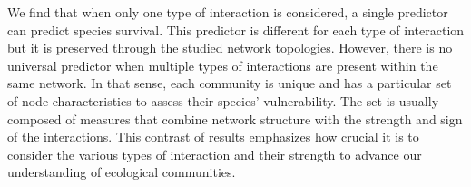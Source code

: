 We find that when only one type of interaction is considered, a single predictor can predict species survival. 
This predictor is different for each type of interaction but it is preserved through the studied network topologies. However, there is no universal predictor when multiple types of interactions are present within the same network. In that sense, each community is unique and has a particular set of node characteristics to assess their species' vulnerability. The set is usually composed of measures that combine network structure with the strength and sign of the interactions. This contrast of results emphasizes how crucial it is to consider the various types of interaction and their strength to advance our understanding of ecological communities.


